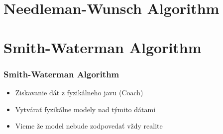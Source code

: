 \documentclass{beamer}
\begin{document}
\section{Needleman-Wunsch Algorithm}

\begin{frame}

\end{frame}



\section{Smith-Waterman Algorithm}
\begin{frame}
\frametitle{Smith-Waterman Algorithm}
\begin{itemize}
    \item Ziskavanie dát z fyzikálneho javu (Coach)
    \item Vytvárať fyzikálne modely nad týmito dátami
    \item Vieme že model nebude zodpovedať vždy realite 
\end{itemize}    

   
   

\end{frame}
\end{document}
